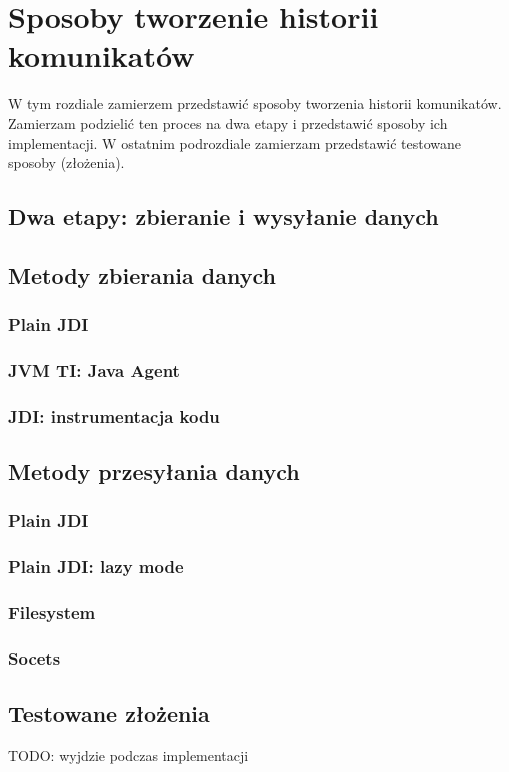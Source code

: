 \chapter{Sposoby tworzenie historii komunikatów}

W tym rozdiale zamierzem przedstawić sposoby tworzenia historii komunikatów. Zamierzam podzielić ten proces na dwa etapy i przedstawić sposoby ich implementacji. W ostatnim podrozdiale zamierzam przedstawić testowane sposoby (złożenia). 

\section{Dwa etapy: zbieranie i wysyłanie danych}

\section{Metody zbierania danych}

\subsection{Plain JDI}

\subsection{JVM TI: Java Agent}

\subsection{JDI: instrumentacja kodu}

\section{Metody przesyłania danych}

\subsection{Plain JDI}

\subsection{Plain JDI: lazy mode}

\subsection{Filesystem}

\subsection{Socets}

\section{Testowane złożenia}

TODO: wyjdzie podczas implementacji

